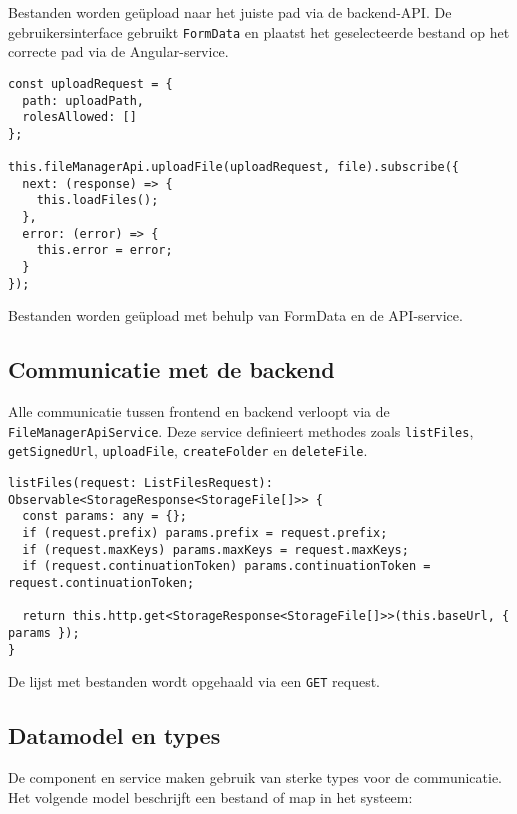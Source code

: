 Bestanden worden geüpload naar het juiste pad via de backend-API. De gebruikersinterface gebruikt \texttt{FormData} en plaatst het geselecteerde bestand op het correcte pad via de Angular-service.

\begin{listing}[H]
\begin{verbatim}
const uploadRequest = {
  path: uploadPath,
  rolesAllowed: []
};

this.fileManagerApi.uploadFile(uploadRequest, file).subscribe({
  next: (response) => {
    this.loadFiles();
  },
  error: (error) => {
    this.error = error;
  }
});
\end{verbatim}
\caption[Uploadfunctionaliteit in de component]{Bestanden worden geüpload met behulp van FormData en de API-service.}
\end{listing}

\subsection{Communicatie met de backend}

Alle communicatie tussen frontend en backend verloopt via de \texttt{FileManagerApiService}. Deze service definieert methodes zoals \texttt{listFiles}, \texttt{getSignedUrl}, \texttt{uploadFile}, \texttt{createFolder} en \texttt{deleteFile}.

\begin{listing}[H]
\begin{verbatim}
listFiles(request: ListFilesRequest): Observable<StorageResponse<StorageFile[]>> {
  const params: any = {};
  if (request.prefix) params.prefix = request.prefix;
  if (request.maxKeys) params.maxKeys = request.maxKeys;
  if (request.continuationToken) params.continuationToken = request.continuationToken;

  return this.http.get<StorageResponse<StorageFile[]>>(this.baseUrl, { params });
}
\end{verbatim}
\caption[API-call naar de backend]{De lijst met bestanden wordt opgehaald via een \texttt{GET} request.}
\end{listing}

\subsection{Datamodel en types}

De component en service maken gebruik van sterke types voor de communicatie. Het volgende model beschrijft een bestand of map in het systeem:

